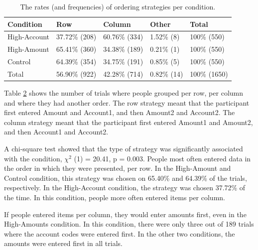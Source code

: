 \begin{table}
\begin{enumerate}
\begin{table}[!ht]
\centering
\begin{tabular}{|l|l|l|l|l|}
\cline{1-5}
Condition    & Row           & Column      & Other       & Total      \\ \hline
High-Account & 37.72\% {\footnotesize (208)} & 60.76\% {\footnotesize (334)} & 1.52\% (8)  & 100\% {\footnotesize (550)}  \\ \hline
High-Amount  & 65.41\% {\footnotesize (360)} & 34.38\% {\footnotesize (189)} & 0.21\% (1)  & 100\% {\footnotesize (550)}  \\ \hline
Control      & 64.39\% {\footnotesize (354)} & 34.75\% {\footnotesize (191)} & 0.85\% (5)  & 100\% {\footnotesize (550)}  \\ \hline
Total        & 56.90\% {\footnotesize (922)} & 42.28\% {\footnotesize (714)} & 0.82\% (14) & 100\% {\footnotesize (1650)} \\ \hline
\end{tabular}
\caption{The rates (and frequencies) of ordering strategies per condition.}\label{table:ch34_4-str-order}
\end{table}

Table \ref{table:ch34_4-str-order} shows the number of trials where people grouped per row, per column and where they had another order. The row strategy meant that the participant first entered Amount and Account1, and then Amount2 and Account2. The column strategy meant that the participant first entered Amount1 and Amount2, and then Account1 and Account2. 

A chi-square test showed that the type of strategy was significantly associated with the condition, $\chi^2$ (1) = 20.41, p = 0.003. 
People most often entered data in the order in which they were presented, per row. In the High-Amount and Control condition, this strategy was chosen on 65.40\% and 64.39\% of the trials, respectively. In the High-Account condition, the strategy was chosen 37.72\% of the time. In this condition, people more often entered items per column. 

If people entered items per column, they would enter amounts first, even in the High-Amounts condition. In this condition, there were only three out of 189 trials where the account codes were entered first. In the other two conditions, the amounts were entered first in all trials. 


\end{enumerate}
\end{table}
